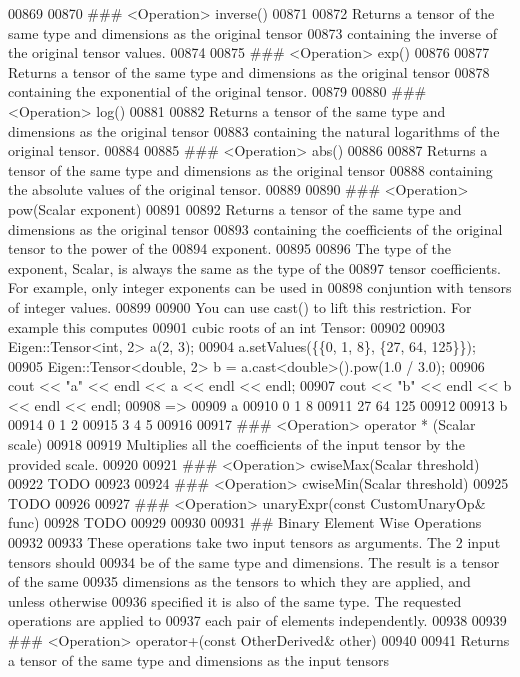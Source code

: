 \begin{DoxyCode}
00869 
00870 ### <Operation> inverse()
00871 
00872 Returns a tensor of the same type and dimensions as the original tensor
00873 containing the inverse of the original tensor values.
00874 
00875 ### <Operation> exp()
00876 
00877 Returns a tensor of the same type and dimensions as the original tensor
00878 containing the exponential of the original tensor.
00879 
00880 ### <Operation> log()
00881 
00882 Returns a tensor of the same type and dimensions as the original tensor
00883 containing the natural logarithms of the original tensor.
00884 
00885 ### <Operation> abs()
00886 
00887 Returns a tensor of the same type and dimensions as the original tensor
00888 containing the absolute values of the original tensor.
00889 
00890 ### <Operation> pow(Scalar exponent)
00891 
00892 Returns a tensor of the same type and dimensions as the original tensor
00893 containing the coefficients of the original tensor to the power of the
00894 exponent.
00895 
00896 The type of the exponent, Scalar, is always the same as the type of the
00897 tensor coefficients.  For example, only integer exponents can be used in
00898 conjuntion with tensors of integer values.
00899 
00900 You can use cast() to lift this restriction.  For example this computes
00901 cubic roots of an int Tensor:
00902 
00903     Eigen::Tensor<int, 2> a(2, 3);
00904     a.setValues(\{\{0, 1, 8\}, \{27, 64, 125\}\});
00905     Eigen::Tensor<double, 2> b = a.cast<double>().pow(1.0 / 3.0);
00906     cout << "a" << endl << a << endl << endl;
00907     cout << "b" << endl << b << endl << endl;
00908     =>
00909     a
00910     0   1   8
00911     27  64 125
00912 
00913     b
00914     0 1 2
00915     3 4 5
00916 
00917 ### <Operation>  operator * (Scalar scale)
00918 
00919 Multiplies all the coefficients of the input tensor by the provided scale.
00920 
00921 ### <Operation>  cwiseMax(Scalar threshold)
00922 TODO
00923 
00924 ### <Operation>  cwiseMin(Scalar threshold)
00925 TODO
00926 
00927 ### <Operation>  unaryExpr(const CustomUnaryOp& func)
00928 TODO
00929 
00930 
00931 ## Binary Element Wise Operations
00932 
00933 These operations take two input tensors as arguments. The 2 input tensors should
00934 be of the same type and dimensions. The result is a tensor of the same
00935 dimensions as the tensors to which they are applied, and unless otherwise
00936 specified it is also of the same type. The requested operations are applied to
00937 each pair of elements independently.
00938 
00939 ### <Operation> operator+(const OtherDerived& other)
00940 
00941 Returns a tensor of the same type and dimensions as the input tensors

\end{DoxyCode}
